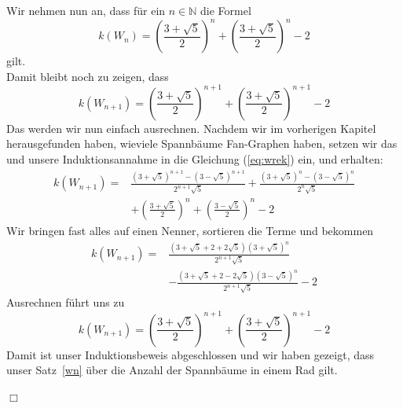 Wir nehmen nun an, dass für ein $n \in \mathbb{N}$ die Formel 
\begin{equation}
 \mathit{k}\left(W_n\right) = \left(\frac{3+\sqrt{5}}{2}\right)^n+\left(\frac{3+\sqrt{5}}{2}\right)^n-2
\end{equation}
gilt.\\
Damit bleibt noch zu zeigen, dass
\begin{equation}
 \mathit{k}\left(W_{n+1}\right) = \left(\frac{3+\sqrt{5}}{2}\right)^{n+1}+\left(\frac{3+\sqrt{5}}{2}\right)^{n+1}-2
\end{equation}
Das werden wir nun einfach ausrechnen.
Nachdem wir im vorherigen Kapitel herausgefunden haben, wieviele Spannbäume Fan-Graphen haben, setzen wir das und unsere Induktionsannahme in die Glei\-chung (\ref{eq:wrek}) ein, und erhalten:\\
\begin{equation}
\begin{aligned}
\mathit{k}\left(W_{n+1}\right) ={} & \frac{\left(3+\sqrt{5}\right)^{n+1}-\left(3-\sqrt{5}\right)^{n+1}}{2^{n+1}\sqrt{5}} + \frac{\left(3+\sqrt{5}\right)^{n}-\left(3-\sqrt{5}\right)^{n}}{2^{n}\sqrt{5}}\\
& + \left(\frac{3+\sqrt{5}}{2}\right)^n+\left(\frac{3-\sqrt{5}}{2}\right)^n-2
\end{aligned}
\end{equation}
Wir bringen fast alles auf einen Nenner, sortieren die Terme und bekommen
\begin{equation}
\begin{aligned}
\mathit{k}\left(W_{n+1}\right) = {}  & \frac{\left(3+\sqrt{5}+2+2\sqrt{5}\right)\left(3+\sqrt{5}\right)^{n}}{2^{n+1}\sqrt{5}} \\%
                        & -\frac{\left(3+\sqrt{5}+2-2\sqrt{5}\right)\left(3-\sqrt{5}\right)^{n}}{2^{n+1}\sqrt{5}}-2 
\end{aligned}
\end{equation}
Ausrechnen führt uns zu\\
\begin{equation}
\mathit{k}\left(W_{n+1}\right) = \left(\frac{3+\sqrt{5}}{2}\right)^{n+1}+\left(\frac{3+\sqrt{5}}{2}\right)^{n+1}-2
\end{equation}
Damit ist unser Induktionsbeweis abgeschlossen und wir haben gezeigt, dass unser Satz~\ref{wn} über die Anzahl der Spannbäume in einem Rad gilt.
\begin{flushright} $\Box$ \end{flushright} 
